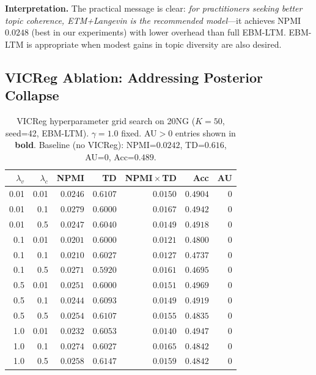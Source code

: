 \documentclass[10pt]{article}
\newcommand{\best}[1]{\textbf{#1}}
\begin{document}
\noindent\textbf{Interpretation.} The practical message is clear: \emph{for practitioners
seeking better topic coherence, ETM+Langevin is the recommended model}---it achieves
NPMI $0.0248$ (best in our experiments) with lower overhead than full EBM-LTM.
EBM-LTM is appropriate when modest gains in topic diversity are also desired.

\subsection{VICReg Ablation: Addressing Posterior Collapse}
\label{sec:vicreg_ablation}

\begin{table}[t]
\centering
\caption{VICReg hyperparameter grid search on 20NG ($K=50$, seed=42, EBM-LTM).
$\gamma=1.0$ fixed. AU$>0$ entries shown in \best{bold}.
Baseline (no VICReg): NPMI=$0.0242$, TD=$0.616$, AU=0, Acc=$0.489$.}
\label{tab:vicreg}
\small
\setlength{\tabcolsep}{4pt}
\begin{tabular}{rrrrrrr}
\hline
$\lambda_v$ & $\lambda_c$ & \textbf{NPMI} & \textbf{TD} & \textbf{NPMI$\!\times\!$TD} & \textbf{Acc} & \textbf{AU} \\
\hline
  0.01 & 0.01 & $0.0246$ & $0.6107$ & $0.0150$ & $0.4904$ & 0 \\
  0.01 & 0.1 & $0.0279$ & $0.6000$ & $0.0167$ & $0.4942$ & 0 \\
  0.01 & 0.5 & $0.0247$ & $0.6040$ & $0.0149$ & $0.4918$ & 0 \\
  0.1 & 0.01 & $0.0201$ & $0.6000$ & $0.0121$ & $0.4800$ & 0 \\
  0.1 & 0.1 & $0.0210$ & $0.6027$ & $0.0127$ & $0.4737$ & 0 \\
  0.1 & 0.5 & $0.0271$ & $0.5920$ & $0.0161$ & $0.4695$ & 0 \\
  0.5 & 0.01 & $0.0251$ & $0.6000$ & $0.0151$ & $0.4969$ & 0 \\
  0.5 & 0.1 & $0.0244$ & $0.6093$ & $0.0149$ & $0.4919$ & 0 \\
  0.5 & 0.5 & $0.0254$ & $0.6107$ & $0.0155$ & $0.4835$ & 0 \\
  1.0 & 0.01 & $0.0232$ & $0.6053$ & $0.0140$ & $0.4947$ & 0 \\
  1.0 & 0.1 & $0.0274$ & $0.6027$ & $0.0165$ & $0.4842$ & 0 \\
  1.0 & 0.5 & $0.0258$ & $0.6147$ & $0.0159$ & $0.4842$ & 0 \\
\hline
\end{tabular}
\end{table}
\end{document}
